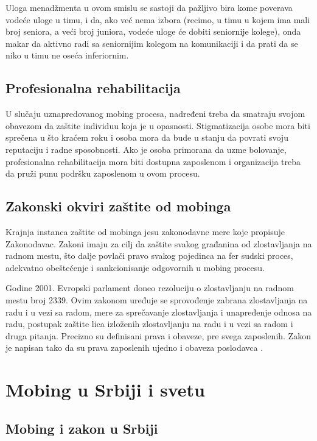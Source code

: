 \documentclass[a4paper]{article}
\begin{document}
    Uloga menadžmenta u ovom smislu se sastoji da pažljivo bira kome poverava vodeće uloge u timu, i da, ako već nema izbora (recimo, u timu u kojem ima mali broj seniora, a veći broj juniora, vodeće uloge će dobiti seniornije kolege), onda makar da aktivno radi sa seniornijim kolegom na komunikaciji i da prati da se niko u timu ne oseća inferiornim.

    \subsection{Profesionalna rehabilitacija}
    U slučaju uznapredovanog mobing procesa, nadređeni treba da smatraju svojom obavezom da zaštite individuu koja je u opasnosti. Stigmatizacija osobe mora biti sprečena u što kraćem roku i osoba mora da bude u stanju da povrati svoju reputaciju i radne sposobnosti. Ako je osoba primorana da uzme bolovanje, profesionalna rehabilitacija mora biti dostupna zaposlenom i organizacija treba da pruži punu podršku zaposlenom u ovom procesu.

    \subsection{Zakonski okviri zaštite od mobinga}
    Krajnja instanca zaštite od mobinga jesu zakonodavne mere koje propisuje Zakonodavac. Zakoni imaju za cilj da zaštite svakog građanina od zlostavljanja na radnom mestu, što dalje povlači pravo svakog pojedinca na fer sudski proces, adekvatno obeštećenje i sankcionisanje odgovornih u mobing procesu.

    Godine 2001. Evropski parlament doneo rezoluciju o zlostavljanju na radnom mestu broj 2339. Ovim zakonom uređuje se sprovođenje zabrana zlostavljanja na radu i u vezi sa radom, mere za sprečavanje zlostavljanja i unapređenje odnosa na radu, postupak zaštite lica izloženih zlostavljanju na radu i u vezi sa radom i druga pitanja. Precizno su definisani prava i obaveze, pre svega zaposlenih. Zakon je napisan tako da su prava zaposlenih ujedno i obaveza poslodavca .

    \section{Mobing u Srbiji i svetu}
    
    \subsection{Mobing i zakon u Srbiji}
    
\end{document}
